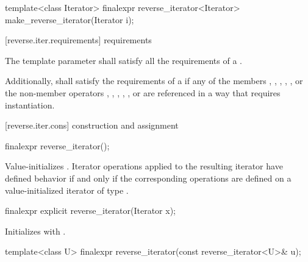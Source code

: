 \begin{codeblock}
{  template<class Iterator>
    finalexpr reverse_iterator<Iterator> make_reverse_iterator(Iterator i);
}
\end{codeblock}

[reverse.iter.requirements]{ requirements}

\pnum
The template parameter
shall satisfy all the requirements of a .

\pnum
Additionally,
shall satisfy the requirements of a 
if any of the members
,
,
,
,
,
or the non-member operators
,
,
,
,
,
or
are referenced in a way that requires instantiation.

[reverse.iter.cons]{ construction and assignment}

%
\begin{itemdecl}
finalexpr reverse_iterator();
\end{itemdecl}

\begin{itemdescr}
\pnum
\effects
Value-initializes
.
Iterator operations applied to the resulting iterator have defined behavior
if and only if the corresponding operations are defined on a value-initialized iterator of type
.
\end{itemdescr}

%
\begin{itemdecl}
finalexpr explicit reverse_iterator(Iterator x);
\end{itemdecl}

\begin{itemdescr}
\pnum
\effects
Initializes
with .
\end{itemdescr}

%
\begin{itemdecl}
template<class U> finalexpr reverse_iterator(const reverse_iterator<U>& u);
\end{itemdecl}

